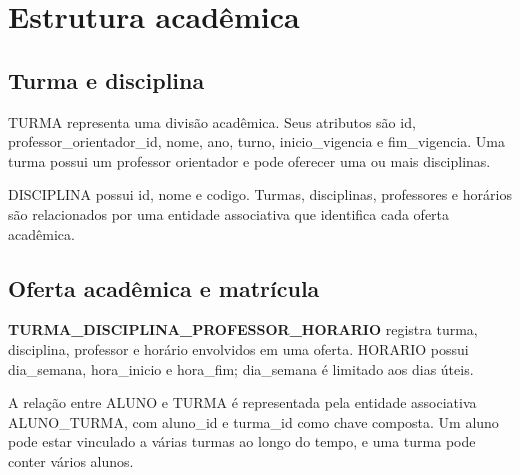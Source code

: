 \section{Estrutura acadêmica}
\subsection{Turma e disciplina}
TURMA representa uma divisão acadêmica. Seus atributos são id, professor\_orientador\_id, nome, ano, turno, inicio\_vigencia e fim\_vigencia. Uma turma possui um professor orientador e pode oferecer uma ou mais disciplinas.

DISCIPLINA possui id, nome e codigo. Turmas, disciplinas, professores e horários são relacionados por uma entidade associativa que identifica cada oferta acadêmica.

\subsection{Oferta acadêmica e matrícula}
\textbf{TURMA\_DISCIPLINA\_PROFESSOR\_HORARIO} registra turma, disciplina, professor e horário envolvidos em uma oferta. HORARIO possui dia\_semana, hora\_inicio e hora\_fim; dia\_semana é limitado aos dias úteis.

A relação entre ALUNO e TURMA é representada pela entidade associativa ALUNO\_TURMA, com aluno\_id e turma\_id como chave composta. Um aluno pode estar vinculado a várias turmas ao longo do tempo, e uma turma pode conter vários alunos.
